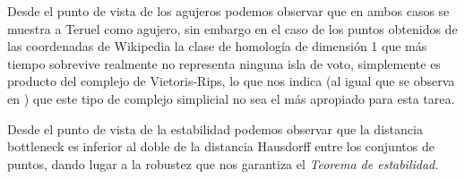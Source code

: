 Desde el punto de vista de los agujeros podemos observar que en ambos casos se muestra a Teruel como agujero, sin embargo en el caso de los puntos obtenidos de las coordenadas de Wikipedia la clase de homología de dimensión 1 que más tiempo sobrevive realmente no representa ninguna isla de voto, simplemente es producto del complejo de Vietoris-Rips, lo que nos indica (al igual que se observa en \cite{votosArticulo}) que este tipo de complejo simplicial no sea el más apropiado para esta tarea.

Desde el punto de vista de la estabilidad podemos observar que la distancia bottleneck es inferior al doble de la distancia Hausdorff entre los conjuntos de puntos, dando lugar a la robustez que nos garantiza el \emph{Teorema de estabilidad}.

